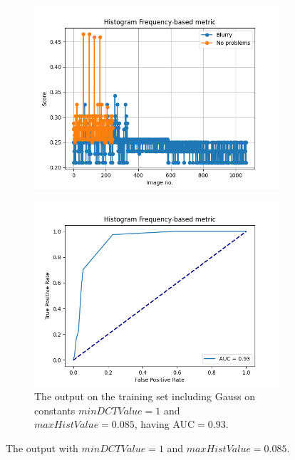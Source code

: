 \begin{figure}[H]
\begin{subfigure}[t]{0.48\textwidth}
        \label{fig:HF_roc_85}
    \end{subfigure}\hspace{1em}
    \begin{subfigure}[t]{0.48\textwidth}
        \includegraphics[width=\textwidth]{Figures/BlurredImages/tweakHF/min1_max0.085_output_basic.png}
        \caption{}
        \label{fig:HF_basic_gauss_85}
    \end{subfigure}\hspace{1em}
    \begin{subfigure}[t]{0.48\textwidth}
        \includegraphics[width=\textwidth]{Figures/BlurredImages/tweakHF/min1_max0.085_output_roc.png}
        \caption{The output on the training set including Gauss on constants $minDCTValue=1$ and $maxHistValue=0.085$, having AUC$=0.93$.}
        \label{fig:HF_roc_gauss_85}
    \end{subfigure}
    \caption{The output with $minDCTValue=1$ and $maxHistValue=0.085$.}
\end{figure}

